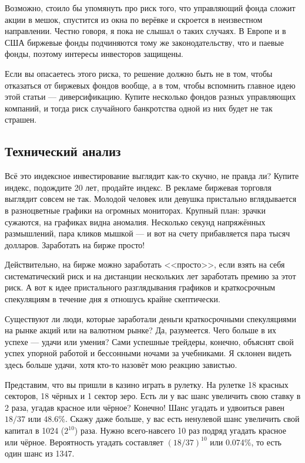 Возможно, стоило бы упомянуть про риск того, что управляющий фонда сложит акции в мешок, спустится из окна по верёвке и скроется в неизвестном направлении. Честно говоря, я пока не слышал о таких случаях. В Европе и в США биржевые фонды подчиняются тому же законодательству, что и паевые фонды, поэтому интересы инвесторов защищены. 

Если вы опасаетесь этого риска, то решение должно быть не в том, чтобы отказаться от биржевых фондов вообще, а в том, чтобы вспомнить главное идею этой статьи --- диверсификацию. Купите несколько фондов разных управляющих компаний, и тогда риск случайного банкротства одной из них будет не так страшен.

\subsection{Технический анализ}

Всё это индексное инвестирование выглядит как-то скучно, не правда ли? Купите
индекс, подождите 20 лет, продайте индекс. В рекламе биржевая торговля выглядит
совсем не так. Молодой человек или девушка пристально вглядывается в 
разноцветные графики на огромных мониторах. Крупный план: зрачки сужаются, на 
графиках видна аномалия. Несколько секунд напряжённых размышлений, пара кликов 
мышкой --- и вот на счету прибавляется пара тысяч долларов. Заработать на 
бирже просто!

Действительно, на бирже можно заработать <<просто>>, если взять на себя 
систематический риск и на дистанции нескольких лет заработать премию за этот 
риск. А вот к идее пристального разглядывания графиков и краткосрочным 
спекуляциям в течение дня я отношусь крайне скептически.

Существуют ли люди, которые заработали деньги краткосрочными спекуляциями на 
рынке акций или на валютном рынке? Да, разумеется. Чего больше в их успехе --- 
удачи или умения? Сами успешные трейдеры, конечно, объяснят свой успех упорной
работой и бессонными ночами за учебниками. Я склонен видеть здесь больше удачи,
хотя кто-то назовёт мою реакцию завистью.

Представим, что вы пришли в казино играть в рулетку. На рулетке 18 красных 
секторов, 18 чёрных и 1 сектор зеро. Есть ли у вас шанс увеличить свою ставку в
2 раза, угадав красное или чёрное? Конечно! Шанс угадать и удвоиться равен 
$18/37$ или $48.6\%$. Скажу даже больше, у вас есть ненулевой шанс увеличить 
свой капитал в 1024 ($2^{10}$) раза. Нужно всего-навсего 10 раз подряд угадать 
красное или чёрное. Вероятность угадать составляет $(18/37)^{10}$ или 0.074\%, 
то есть один шанс из 1347.

